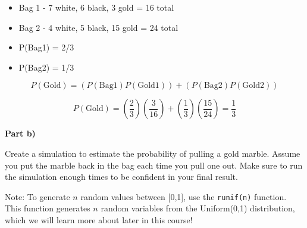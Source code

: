 \documentclass[
  letterpaper,
  DIV=11,
  numbers=noendperiod]{scrartcl}
\providecommand{\tightlist}{%
  \setlength{\itemsep}{0pt}\setlength{\parskip}{0pt}}\usepackage{longtable,booktabs,array}
\begin{document}
\begin{itemize}
\tightlist
\item
  Bag 1 - 7 white, 6 black, 3 gold = 16 total
\item
  Bag 2 - 4 white, 5 black, 15 gold = 24 total
\item
  P(Bag1) = 2/3
\item
  P(Bag2) = 1/3
\end{itemize}

\[P(\text{Gold}) = \left(P(\text{Bag1})P(\text{Gold1})\right) + \left(P(\text{Bag2})P(\text{Gold2})\right)\]

\[P(\text{Gold}) = \left(\frac{2}{3}\right)\left(\frac{3}{16}\right) + \left(\frac{1}{3}\right)\left(\frac{15}{24}\right) = \frac{1}{3}\]

\textbf{Part b)}

Create a simulation to estimate the probability of pulling a gold
marble. Assume you put the marble back in the bag each time you pull one
out. Make sure to run the simulation enough times to be confident in
your final result.

Note: To generate \(n\) random values between {[}0,1{]}, use the
\texttt{runif(n)} function. This function generates \(n\) random
variables from the Uniform(0,1) distribution, which we will learn more
about later in this course!
\end{document}
